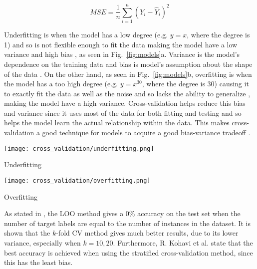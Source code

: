 \begin{equation}\label{mse}
MSE = \frac{1}{n}\sum^{n}_{i=1}(Y_i - \hat{Y}_i)^2
\end{equation}

Underfitting  is when the model has a low degree (e.g. $y = x$, where the degree is 1) and so is not flexible enough to fit the data making the model have a low variance and high bias \citep{baumann2003cross}, as seen in Fig.~\ref{fig:models}a. Variance is the model's dependence on the training data and bias is model's assumption about the shape of the data \citep{arlot2010survey}. On the other hand, as seen in Fig.~\ref{fig:models}b, overfitting  is when the model has a too high degree (e.g. $y = x^{30}$, where the degree is 30) causing it to exactly fit the data as well as the noise and so lacks the ability to generalize \citep{baumann2003cross}, making the model have a high variance. Cross-validation helps reduce this bias and variance since it uses most of the data for both fitting and testing and so helps the model learn the actual relationship within the data. This makes cross-validation a good technique for models to acquire a good bias-variance tradeoff \citep{arlot2010survey}.


\begin{marginfigure}%
	\centering
	\texttt{[image: cross\_validation/underfitting.png]}
	\caption{Underfitting}
	\label{fig:underfitting}
\end{marginfigure}
\begin{marginfigure}%
	\centering	
	\texttt{[image: cross\_validation/overfitting.png]}
	\caption{Overfitting}
	\label{fig:models}
\end{marginfigure}

As stated in \citep{kohavi1995study}, the LOO method gives a 0\% accuracy on the test set when the number of target labels are equal to the number of instances in the dataset. It is shown that the $k$-fold CV method gives much better results, due to its lower variance, especially when $k = {10, 20}$. Furthermore, R. Kohavi et al. state that the best accuracy is achieved when using the stratified cross-validation method, since this has the least bias.

